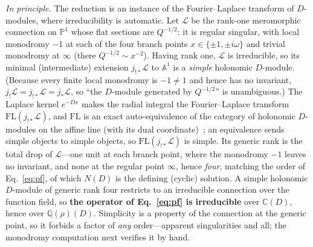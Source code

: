 \documentclass[aps,pra,twocolumn,superscriptaddress,longbibliography]{revtex4-2}
\begin{document}
\emph{In principle.}  The reduction is an instance of the Fourier--Laplace
transform of $D$-modules, where irreducibility is automatic.  Let $\mathcal{L}$ be
the rank-one meromorphic connection on $\mathbb{P}^{1}$ whose flat sections are
$Q^{-1/2}$: it is regular singular, with local monodromy $-1$ at each of the four
branch points $x\in\{\pm1,\pm i\omega\}$ and trivial monodromy at $\infty$ (there
$Q^{-1/2}\sim x^{-2}$).  Having rank one, $\mathcal{L}$ is irreducible, so its
minimal (intermediate) extension $j_{!*}\mathcal{L}$ to $\mathbb{A}^{1}$ is a
\emph{simple} holonomic $D$-module.  (Because every finite local monodromy is
$-1\neq1$ and hence has no invariant, $j_!\mathcal{L}=j_{!*}\mathcal{L}=j_*\mathcal{L}$,
so ``the $D$-module generated by $Q^{-1/2}$'' is unambiguous.)  The Laplace kernel
$e^{-Dx}$ makes the radial integral the Fourier--Laplace transform
$\mathrm{FL}(j_{!*}\mathcal{L})$, and $\mathrm{FL}$ is an exact auto-equivalence of
the category of holonomic $D$-modules on the affine line (with its dual
coordinate)~\cite{katz1990}; an equivalence sends simple objects to simple
objects, so $\mathrm{FL}(j_{!*}\mathcal{L})$ is simple.  Its generic rank
is the total drop of $\mathcal{L}$---one unit at each branch point, where the
monodromy $-1$ leaves no invariant, and none at the regular point $\infty$, hence
\emph{four}, matching the order of Eq.~\eqref{eq:pf}, of which $N(D)$ is the
defining (cyclic) solution.  A simple holonomic $D$-module of generic rank four
restricts to an irreducible connection over the function field, so \textbf{the
operator of Eq.~\eqref{eq:pf} is irreducible} over $\mathbb{C}(D)$, hence over
$\mathbb{Q}(\rho)(D)$.  Simplicity is a property of the connection at the generic
point, so it forbids a factor of \emph{any} order---apparent singularities and
all; the monodromy computation next verifies it by hand.
\end{document}
